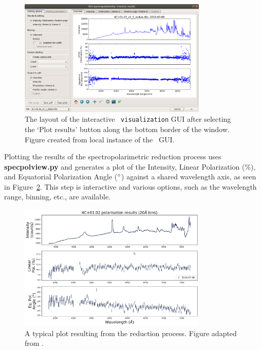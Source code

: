 \begin{figure}[t]
    \centering
    \includegraphics[width = 0.8\textwidth]{figures/3_polsalt_viz.png}
    \caption{The layout of the interactive \polsalt\ \texttt{visualization} \gls{GUI} after selecting the `Plot results' button along the bottom border of the window. Figure created from local instance of the \polsalt\ \gls{GUI}.}
    \label{fig:polsalt_gui_vis}
\end{figure}

Plotting the results of the spectropolarimetric reduction process uses \textbf{specpolview.py} and generates a plot of the Intensity, Linear Polarization ($\%$), and Equatorial Polarization Angle ($\hbox{$^\circ$}$) against a shared wavelength axis, as seen in Figure~\ref{fig:polsalt_plot}. This step is interactive and various options, such as the wavelength range, binning, etc., are available.

\begin{figure}[t]
    \centering
    \includegraphics[width = 0.8\textwidth]{figures/3_polsalt_plot.pdf}
    \caption{A typical plot resulting from the reduction process. Figure adapted from \citep{cooper_HEASA2022}.}
    \label{fig:polsalt_plot}
\end{figure}

